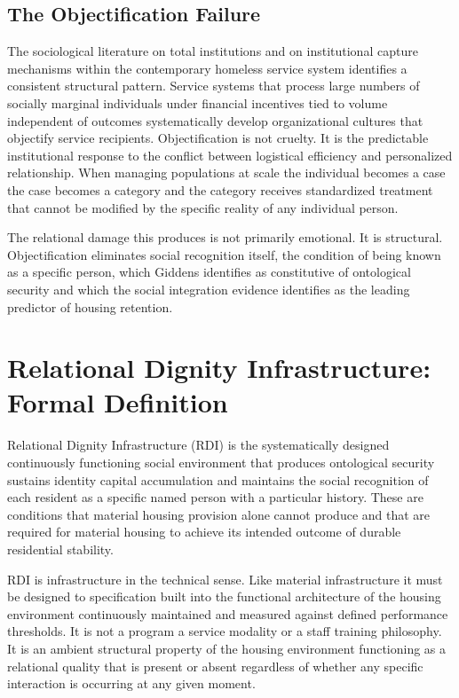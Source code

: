 \documentclass[12pt, letterpaper]{article}
\begin{document}
\subsection{The Objectification Failure}

The sociological literature on total institutions \citep{goffman_1961} and on institutional capture mechanisms within the contemporary homeless service system \citep{roebuck_2022} identifies a consistent structural pattern. Service systems that process large numbers of socially marginal individuals under financial incentives tied to volume independent of outcomes systematically develop organizational cultures that objectify service recipients. Objectification is not cruelty. It is the predictable institutional response to the conflict between logistical efficiency and personalized relationship. When managing populations at scale the individual becomes a case the case becomes a category and the category receives standardized treatment that cannot be modified by the specific reality of any individual person.

The relational damage this produces is not primarily emotional. It is structural. Objectification eliminates social recognition itself, the condition of being known as a specific person, which Giddens identifies as constitutive of ontological security and which the social integration evidence identifies as the leading predictor of housing retention.

\clearpage
\section{Relational Dignity Infrastructure: Formal Definition}

Relational Dignity Infrastructure (RDI) is the systematically designed continuously functioning social environment that produces ontological security sustains identity capital accumulation and maintains the social recognition of each resident as a specific named person with a particular history. These are conditions that material housing provision alone cannot produce and that are required for material housing to achieve its intended outcome of durable residential stability.

RDI is infrastructure in the technical sense. Like material infrastructure it must be designed to specification built into the functional architecture of the housing environment continuously maintained and measured against defined performance thresholds. It is not a program a service modality or a staff training philosophy. It is an ambient structural property of the housing environment functioning as a relational quality that is present or absent regardless of whether any specific interaction is occurring at any given moment.
\end{document}
